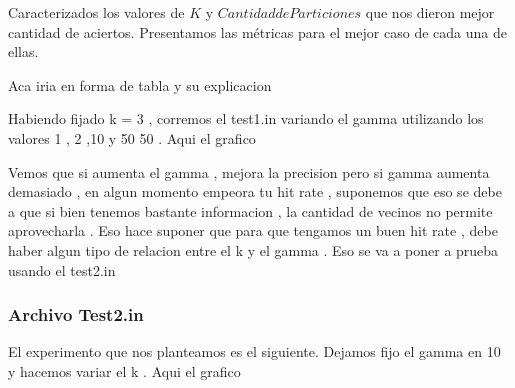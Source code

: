 Caracterizados los valores de $K$ y $Cantidad de Particiones$ que nos dieron mejor cantidad de aciertos. Presentamos las métricas para el mejor caso de cada una de ellas.

Aca iria en forma de tabla y su explicacion



Habiendo fijado k = 3 , corremos el test1.in variando el gamma utilizando los valores 1 , 2 ,10 y 50 50 . Aqui el grafico

Vemos que si aumenta el gamma , mejora la precision pero si gamma aumenta demasiado , en algun momento empeora tu hit rate , suponemos que eso se debe a que si bien tenemos bastante informacion , la cantidad de vecinos no permite aprovecharla . Eso hace suponer que para que tengamos un buen hit rate , debe haber algun tipo de relacion entre el k y el gamma . Eso se va a poner a prueba usando el test2.in

\subsubsection {Archivo Test2.in}




El experimento que nos planteamos es el siguiente. Dejamos fijo el gamma en 10 y hacemos variar el k . Aqui el grafico  

